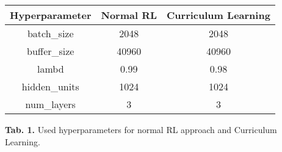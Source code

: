 \begin{center}
    \begin{tabular}{|c|c|c|}
        \rowcolor{gray!50}
        \hline
        \textbf{Hyperparameter} & \textbf{Normal RL} & \textbf{Curriculum Learning} \\ \hline
        batch\_size    & 2048      & 2048                \\ \hline
        buffer\_size   & 40960     & 40960               \\ \hline
        lambd          & 0.99      & 0.98                \\ \hline
        hidden\_units  & 1024      & 1024                \\ \hline
        num\_layers    & 3         & 3                   \\ \hline
    \end{tabular}
\end{center}
\begin{center}
    \vspace{10pt}
    \textbf{Tab. 1.} Used hyperparameters for normal RL approach and Curriculum Learning.
\end{center}

